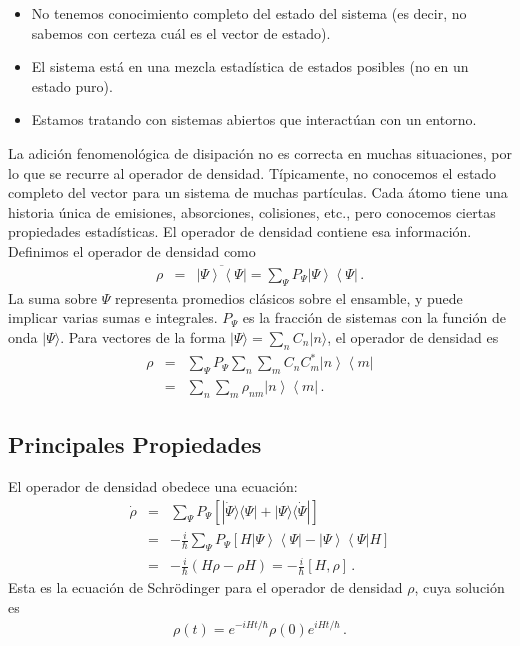\documentclass[12pt]{report}
\providecommand{\bra}[1]{\langle #1 \rvert}
\providecommand{\ket}[1]{\lvert #1 \rangle}
\newcommand{\ketbra}[2]{\left| {#1} \right\rangle\left\langle {#2}\right|}
\begin{document}
\begin{itemize}
    \item No tenemos conocimiento completo del estado del sistema (es decir, no sabemos con certeza cuál es el vector de estado).

    \item El sistema está en una mezcla estadística de estados posibles (no en un estado puro).

    \item Estamos tratando con sistemas abiertos que interactúan con un entorno.
\end{itemize}

La adici\'on fenomenol\'ogica de disipaci\'on no es correcta en muchas 
situaciones, por lo que se recurre al operador de densidad. T\'ipicamente, 
no conocemos el estado completo del vector para un sistema de muchas 
part\'iculas. Cada \'atomo tiene una historia \'unica de emisiones, absorciones, colisiones, etc., pero conocemos ciertas propiedades estad\'isticas. El 
operador de densidad contiene esa informaci\'on. Definimos el operador de 
densidad como 
%
\begin{eqnarray}
\rho &=& \overline{ \ketbra{\Psi}{\Psi} }	
	= \sum_{\Psi} P_{\Psi} \ketbra{\Psi}{\Psi} 	\,.
\end{eqnarray}
La suma sobre $\Psi$ representa promedios cl\'asicos sobre el ensamble, 
y puede implicar varias sumas e integrales. $P_{\Psi}$ es la fracci\'on de 
sistemas con la funci\'on de onda $\ket{\Psi}$.  Para vectores de la forma 
$\ket{\Psi} = \sum_n C_n \ket{n}$, el operador de densidad es 
%
\begin{eqnarray*}
\rho &=& \sum_{\Psi} P_{\Psi} \sum_n \sum_m C_n C_m^\ast 
	\ketbra{n}{m} 	\\ 
&=& \sum_n \sum_m \rho_{nm} \ketbra{n}{m}  	\,.
\end{eqnarray*}




\subsection{Principales Propiedades}
El operador de densidad obedece una ecuaci\'on: 
%
\begin{eqnarray}
\dot{\rho} &=& \sum_{\Psi} P_{\Psi} \left[ | \dot{\Psi} \rangle \bra{\Psi}  
	+ \ket{\Psi} \langle \dot{\Psi} | \right] 	\nonumber \\ 
&=& - \frac{i}{\hbar} \sum_{\Psi} P_{\Psi} \left[ 
	H \ketbra{\Psi}{\Psi} - \ketbra{\Psi}{\Psi} H \right] 
	\nonumber \\ 
&=& - \frac{i}{\hbar} (H \rho -\rho H) 	= - \frac{i}{\hbar} [H, \rho] 	\,.
\end{eqnarray}
Esta es la ecuaci\'on de Schr\"odinger para el operador de densidad $\rho$, 
cuya soluci\'on es  
%
\begin{eqnarray}
\rho (t) = e^{-iHt/\hbar} \rho(0)  e^{iHt/\hbar} \,.
\end{eqnarray}
\end{document}
